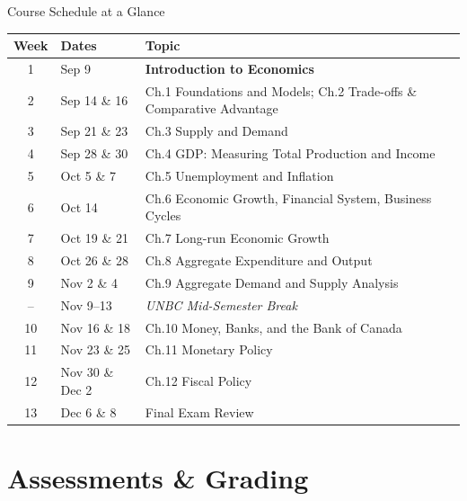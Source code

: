 \documentclass[aspectratio=169]{beamer}
\begin{document}
\begin{frame}{Course Schedule at a Glance}
\transfade
\footnotesize
\begin{tabular}{@{}cll@{}}
  \toprule
  \textbf{Week} & \textbf{Dates} & \textbf{Topic} \\
  \midrule
  1  & Sep 9             & \textbf{Introduction to Economics} \\
  2  & Sep 14 \& 16      & Ch.1 Foundations and Models; Ch.2 Trade-offs \& Comparative Advantage \\
  3  & Sep 21 \& 23      & Ch.3 Supply and Demand \\
  4  & Sep 28 \& 30      & Ch.4 GDP: Measuring Total Production and Income \\
  5  & Oct 5 \& 7        & Ch.5 Unemployment and Inflation \\
  6  & Oct 14            & Ch.6 Economic Growth, Financial System, Business Cycles \\
  7  & Oct 19 \& 21      & Ch.7 Long-run Economic Growth \\
  8  & Oct 26 \& 28      & Ch.8 Aggregate Expenditure and Output \\
  9  & Nov 2 \& 4        & Ch.9 Aggregate Demand and Supply Analysis \\
  --  & Nov 9--13        & \textit{UNBC Mid-Semester Break} \\
  10 & Nov 16 \& 18      & Ch.10 Money, Banks, and the Bank of Canada \\
  11 & Nov 23 \& 25      & Ch.11 Monetary Policy \\
  12 & Nov 30 \& Dec 2   & Ch.12 Fiscal Policy \\
  13 & Dec 6 \& 8        & Final Exam Review \\
  \bottomrule
\end{tabular}
\end{frame}

\section{Assessments \& Grading}
\end{document}
